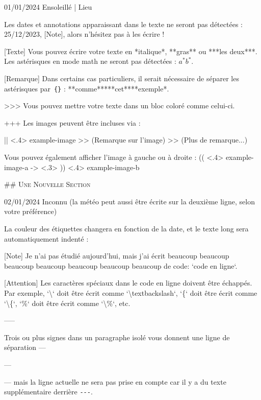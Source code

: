 \documentclass[11pt, paperstyle=light yellow, color entry, day-month-year,
  title in boldface, title in sffamily, use style = classical]{jwjournal}
\begin{document}
01/01/2024 Ensoleillé | Lieu

  Les dates et annotations apparaissant dans le texte ne seront pas détectées : 25/12/2023, [Note], alors n'hésitez pas à les écrire !

  [Texte]
    Vous pouvez écrire votre texte en *italique*, **gras** ou ***les deux***.
    \\
    Les astérisques en mode math ne seront pas détectées : $a^* b^*$.

  [Remarque] Dans certains cas particuliers, il serait nécessaire de séparer les astérisques par~\texttt{\{\}} : **comme**{}***cet***{}*exemple*.

  >>> Vous pouvez mettre votre texte dans un bloc coloré comme celui-ci.

  +++
  Les images peuvent être incluses via :

  || <.4> {example-image} %
  >> (Remarque sur l'image)
  >> (Plus de remarque...)

  Vous pouvez également afficher l'image à gauche ou à droite :
  (( <.4> {example-image-a} %
  -> <.3> %
  )) <.4> {example-image-b} %


## {\textsc{Une Nouvelle Section}}

02/01/2024
Inconnu (la météo peut aussi être écrite sur la deuxième ligne, selon votre préférence)

  La couleur des étiquettes changera en fonction de la date, et le texte long sera automatiquement indenté :

  [Note] Je n'ai pas étudié aujourd'hui, mais j'ai écrit beaucoup beaucoup beaucoup beaucoup beaucoup beaucoup beaucoup de code: `code en ligne`.

  [Attention] Les caractères spéciaux dans le code en ligne doivent être échappés. Par exemple, `\textbackslash` doit être écrit comme `\textbackslash textbackslash`, `\{` doit être écrit comme `\textbackslash\{`, `\%` doit être écrit comme `\textbackslash\%`, etc.

  -----

  Trois ou plus \textquote{\texttt{-}} signes dans un paragraphe isolé vous donnent une ligne de séparation ---

  ---

  --- mais la ligne actuelle ne sera pas prise en compte car il y a du texte supplémentaire derrière \texttt{-}\texttt{-}\texttt{-}.
\end{document}
